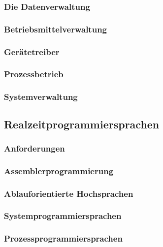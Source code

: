 \documentclass[a4paper,12pt]{article}
\begin{document}
\begin{enumerate}
  \subsubsection{Die Datenverwaltung}

  \subsubsection{Betriebsmittelverwaltung}

  \subsubsection{Gerätetreiber}

  \subsubsection{Prozessbetrieb}

  \subsubsection{Systemverwaltung}

  \subsection{Realzeitprogrammiersprachen}

  \subsubsection{Anforderungen}

  \subsubsection{Assemblerprogrammierung}

  \subsubsection{Ablauforientierte Hochsprachen}

  \subsubsection{Systemprogrammiersprachen}

  \subsubsection{Prozessprogrammiersprachen}


\end{enumerate}
\end{document}
